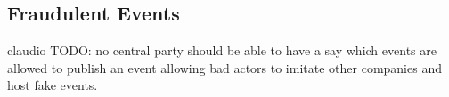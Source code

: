 \subsection{Fraudulent Events}\label{subsection:fraudulent-events}
claudio
TODO: no central party should be able to have a say which events are allowed to publish an event allowing bad actors to imitate other companies and host fake events.